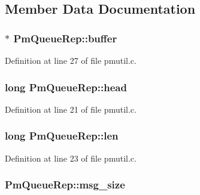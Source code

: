\subsection{Member Data Documentation}
\subsubsection[{\texorpdfstring{buffer}{buffer}}]{$\ast$ Pm\+Queue\+Rep\+::buffer}\hypertarget{struct_pm_queue_rep_a808f75fb14f8aef3ceadc691bbd0986b}{}\label{struct_pm_queue_rep_a808f75fb14f8aef3ceadc691bbd0986b}


Definition at line 27 of file pmutil.\+c.

\subsubsection[{\texorpdfstring{head}{head}}]{\setlength{\rightskip}{0pt plus 5cm}long Pm\+Queue\+Rep\+::head}\hypertarget{struct_pm_queue_rep_ab516ccc6cedbf2ab076e63ad122c10a5}{}\label{struct_pm_queue_rep_ab516ccc6cedbf2ab076e63ad122c10a5}


Definition at line 21 of file pmutil.\+c.

\subsubsection[{\texorpdfstring{len}{len}}]{\setlength{\rightskip}{0pt plus 5cm}long Pm\+Queue\+Rep\+::len}\hypertarget{struct_pm_queue_rep_a6e3749a77433a84bb26f7d89521adc5c}{}\label{struct_pm_queue_rep_a6e3749a77433a84bb26f7d89521adc5c}


Definition at line 23 of file pmutil.\+c.

\subsubsection[{\texorpdfstring{msg\+\_\+size}{msg_size}}]{ Pm\+Queue\+Rep\+::msg\+\_\+size}\hypertarget{struct_pm_queue_rep_a87c1527e7fa395a0aae18efe6f9cd79a}{}\label{struct_pm_queue_rep_a87c1527e7fa395a0aae18efe6f9cd79a}


